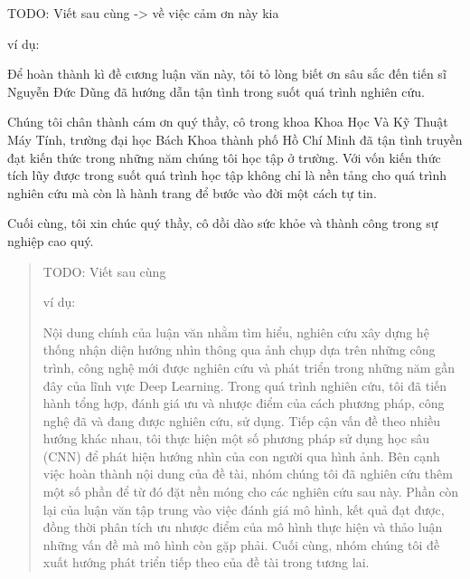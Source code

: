 \documentclass[12pt,a4paper,oneside]{book} %
\begin{document}
\begin{acknowledgments}
	TODO: Viết sau cùng -> về việc cảm ơn này kia

	ví dụ:

	Để hoàn thành kì đề cương luận văn này, tôi tỏ lòng biết ơn sâu sắc đến tiến sĩ Nguyễn Đức Dũng đã hướng dẫn tận tình trong suốt quá trình nghiên cứu.
	
	Chúng tôi chân thành cám ơn quý thầy, cô trong khoa Khoa Học Và Kỹ Thuật Máy Tính, trường đại học Bách Khoa thành phố Hồ Chí Minh đã tận tình truyền đạt kiến thức trong những năm chúng tôi học tập ở trường. Với vốn kiến thức tích lũy được trong suốt quá trình học tập không chỉ là nền tảng cho quá trình nghiên cứu mà còn là hành trang để bước vào đời một cách tự tin.

	Cuối cùng, tôi xin chúc quý thầy, cô dồi dào sức khỏe và thành công trong sự nghiệp cao quý.
	
\end{acknowledgments}
	
\begin{abstract}
	TODO: Viết sau cùng
	
	ví dụ:

	Nội dung chính của luận văn nhằm tìm hiểu, nghiên cứu xây dựng hệ thống nhận diện hướng nhìn thông qua ảnh chụp dựa trên những công trình, công nghệ mới được nghiên cứu và phát triển trong những năm gần đây của lĩnh vực Deep Learning. Trong quá trình nghiên cứu, tôi đã  tiến hành tổng hợp, đánh giá ưu và nhược điểm của cách phương pháp, công nghệ đã và đang được nghiên cứu, sử dụng. Tiếp cận vấn đề theo nhiều hướng khác nhau, tôi thực hiện một số phương pháp sử dụng học sâu (CNN) để phát hiện hướng nhìn của con người qua hình ảnh. Bên cạnh việc hoàn thành nội dung của đề tài, nhóm chúng tôi đã nghiên cứu thêm một số phần để từ đó đặt nền móng cho các nghiên cứu sau này. Phần còn lại của luận văn tập trung vào việc đánh giá mô hình, kết quả đạt được, đồng thời phân tích ưu nhược điểm của mô hình thực hiện và thảo luận những vấn đề mà mô hình còn gặp phải. Cuối cùng, nhóm chúng tôi đề xuất hướng phát triển tiếp theo của đề tài trong tương lai.
\end{abstract}	


\tableofcontents
\listoffigures
\listoftables


\mainmatter

\fancyhead{}  %
\renewcommand{\footrulewidth}{0.4pt}

\pagestyle{fancy}  %
%











\end{document}

